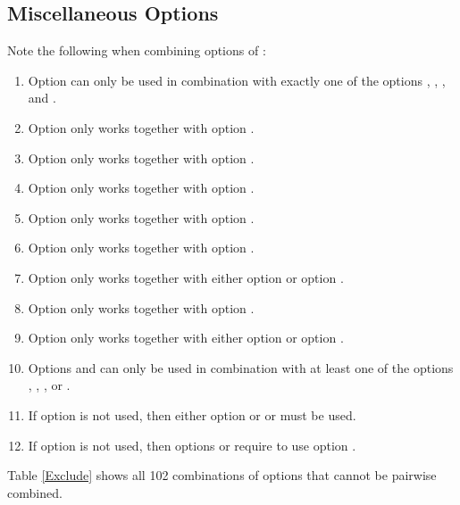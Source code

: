 \documentclass[12pt,titlepage]{article}
\begin{document}
\begin{AboutVmatch}
\subsection{Miscellaneous Options}

\begin{Justshowoptions}




\end{Justshowoptions}

Note the following when combining options of \VM:

\begin{enumerate}
\item
Option  can only be used in combination with
exactly one of the options , , ,
and .
\item
Option  only works together with option .
\item
Option  only works together with option .
\item
Option  only works together with option .
\item
Option  only works together with option .
\item
Option  only works together with option .
\item
Option  only works together with either
option  or option .
\item
Option  only works together with option 
.
\item
Option  only works together with either
option  or option .
\item
Options  and 
can only be used in combination with
at least one of the options , , 
, or .
\item
If option  is not used, then either option 
 or  or  must be used.
\item
If option  is not used, then options
 or  require to use option .
\end{enumerate}
Table \ref{Exclude} shows all 102 combinations of options that
cannot be pairwise combined.


\end{AboutVmatch}
\end{document}
